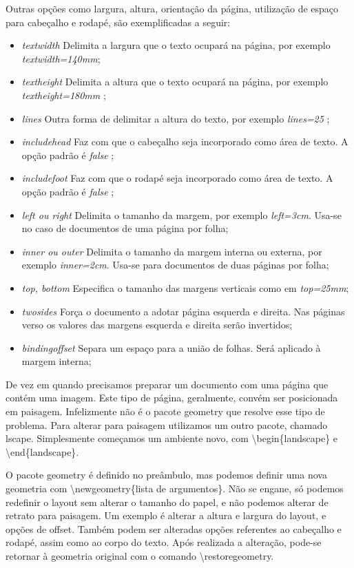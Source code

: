 \begin{landscape}
Outras opções como largura, altura, orientação da página, utilização de espaço para cabeçalho e rodapé, são exemplificadas a seguir:
\begin{multicols}{2}
\begin{itemize}
    \item \emph{textwidth} Delimita a largura que o texto ocupará na página, por exemplo \emph{textwidth=140mm};
    \item \emph{textheight} Delimita a altura que o texto ocupará na página, por exemplo \emph{textheight=180mm} ;
    \item \emph{lines} Outra forma de delimitar a altura do texto, por exemplo \emph{lines=25} ;
    \item \emph{includehead} Faz com que o cabeçalho seja incorporado como área de texto. A opção padrão é \emph{false} ;
    \item \emph{includefoot} Faz com que o rodapé seja incorporado como área de texto. A opção padrão é \emph{false} ;
    \item \emph{left ou right} Delimita o tamanho da margem, por exemplo \emph{left=3cm}. Usa-se no caso de documentos de uma página por folha;
    \item \emph{inner ou outer} Delimita o tamanho da margem interna ou externa, por exemplo \emph{inner=2cm}. Usa-se para documentos de duas páginas por folha;
    \item \emph{top, bottom} Especifica o tamanho das margens verticais como em \emph{top=25mm};
    \item \emph{twosides} Força o documento a adotar página esquerda e direita. Nas páginas verso os valores das margens esquerda e direita serão invertidos;
    \item \emph{bindingoffset} Separa um espaço para a união de folhas. Será aplicado à margem interna;
\end{itemize}
\end{multicols}

\end{landscape}

De vez em quando precisamos preparar um documento com uma página que contém uma imagem.
Este tipo de página, geralmente, convém ser posicionada em paisagem.
Infelizmente não é o pacote geometry que resolve esse tipo de problema.
Para alterar para paisagem utilizamos um outro pacote, chamado lscape.
Simplesmente começamos um ambiente novo, com \textbackslash begin\{landscape\} e \textbackslash end\{landscape\}.

O pacote geometry é definido no preâmbulo, mas podemos definir uma nova geometria com \textbackslash newgeometry\{lista de argumentos\}.
Não se engane, só podemos redefinir o layout sem alterar o tamanho do papel, e não podemos alterar de retrato para paisagem.
Um exemplo é alterar a altura e largura do layout, e opções de offset.
Também podem ser alteradas opções referentes ao cabeçalho e rodapé, assim como ao corpo do texto.
Após realizada a alteração, pode-se retornar à geometria original com o comando \textbackslash restoregeometry.

